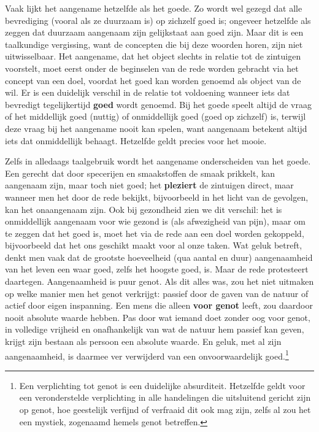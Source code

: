 Vaak lijkt het aangename hetzelfde als het goede. 
Zo wordt wel gezegd dat alle bevrediging (vooral als ze duurzaam is) op zichzelf goed is; ongeveer hetzelfde als zeggen dat duurzaam aangenaam zijn gelijkstaat aan goed zijn. 
Maar dit is een taalkundige vergissing, want de concepten die bij deze woorden horen, zijn niet uitwisselbaar. 
Het aangename, dat het object slechts in relatie tot de zintuigen voorstelt, moet eerst onder de beginselen van de rede worden gebracht via het concept van een doel, voordat het goed kan worden genoemd als object van de wil.
Er is een duidelijk verschil in de relatie tot voldoening wanneer iets dat bevredigt tegelijkertijd \textbf{goed} wordt genoemd. 
Bij het goede speelt altijd de vraag of het middellijk goed (nuttig) of onmiddellijk goed (goed op zichzelf) is, terwijl deze vraag bij het aangename nooit kan spelen, want aangenaam betekent altijd iets dat onmiddellijk behaagt. 
Hetzelfde geldt precies voor het mooie.

Zelfs in alledaags taalgebruik wordt het aangename onderscheiden van het goede. 
Een gerecht dat door specerijen en smaakstoffen de smaak prikkelt, kan aangenaam zijn, maar toch niet goed; het \textbf{pleziert} de zintuigen direct, maar wanneer men het door de rede bekijkt, bijvoorbeeld in het licht van de gevolgen, kan het onaangenaam zijn. 
Ook bij gezondheid zien we dit verschil: het is onmiddellijk aangenaam voor wie gezond is (als afwezigheid van pijn), maar om te zeggen dat het goed is, moet het via de rede aan een doel worden gekoppeld, bijvoorbeeld dat het ons geschikt maakt voor al onze taken.
Wat geluk betreft, denkt men vaak dat de grootste hoeveelheid (qua aantal en duur) aangenaamheid van het leven een waar goed, zelfs het hoogste goed, is. 
Maar de rede protesteert daartegen. 
Aangenaamheid is puur genot. 
Als dit alles was, zou het niet uitmaken op welke manier men het genot verkrijgt: passief door de gaven van de natuur of actief door eigen inspanning. 
Een mens die alleen \textbf{voor genot} leeft, zou daardoor nooit absolute waarde hebben. 
Pas door wat iemand doet zonder oog voor genot, in volledige vrijheid en onafhankelijk van wat de natuur hem passief kan geven, krijgt zijn bestaan als persoon een absolute waarde. 
En geluk, met al zijn aangenaamheid, is daarmee ver verwijderd van een onvoorwaardelijk goed.\footnote{Een verplichting tot genot is een duidelijke absurditeit. Hetzelfde geldt voor een veronderstelde verplichting in alle handelingen die uitsluitend gericht zijn op genot, hoe geestelijk verfijnd of verfraaid dit ook mag zijn, zelfs al zou het een mystiek, zogenaamd hemels genot betreffen.}

